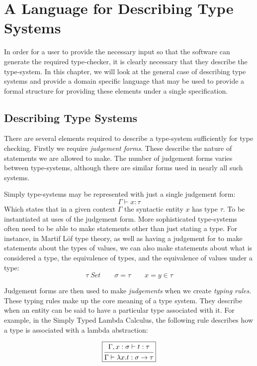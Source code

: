 \chapter{A Language for Describing Type Systems}

In order for a user to provide the necessary input so that the
software can generate the required type-checker, it is clearly
necessary that they describe the type-system. In this chapter, we will
look at the general case of describing type systems and provide a
domain specific language that may be used to provide a formal
structure for providing these elements under a single specification.

\section{Describing Type Systems}

There are several elements required to describe a type-system
sufficiently for type checking. Firstly we require \emph{judgement
  forms}. These describe the nature of statements we are allowed to
make. The number of judgement forms varies between type-systems,
although there are similar forms used in nearly all such systems.

Simply type-systems may be represented with just a single judgement
form:
$$\boxed{\Gamma \vdash x : \tau}$$
Which states that in a given context $\Gamma$ the syntactic entity
$x$ has type $\tau$. To be instantiated at uses of the judgement form.
More sophisticated type-systems often need to be able to make
statements other than just stating a type. For instance, in Martif
L\"of type theory, as well as having a judgement for to make
statements about the types of values, we can also make statements
about what is considered a type, the equivalence of types, and the
equivalence of values under a type:
$$\boxed{\tau \; Set} \qquad \boxed{\sigma = \tau} \qquad \boxed{x = y
  \in \tau}$$

Judgement forms are then used to make \emph{judgements} when we create
\emph{typing rules}. These typing rules make up the core meaning of a
type system. They describe when an entity can be said to have a
particular type associated with it. For example, in the Simply Typed
Lambda Calculus, the following rule describes how a type is associated
with a lambda abstraction:

$$\boxed{
\mbox{\begin {prooftree}
  \hypo{\Gamma , x : \sigma \vdash t : \tau}
  \infer1[]{\Gamma \vdash \lambda x . t : \sigma \to \tau}
\end {prooftree}}
}$$

